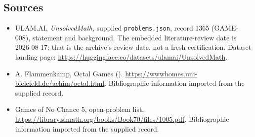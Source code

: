\documentclass[11pt,a4paper]{article}
\begin{document}
\subsection{Sources}

{\small

\begin{itemize}

\item[\hypertarget{source:1365:1}{S1}] ULAM.AI, \emph{UnsolvedMath}, supplied \texttt{problems.json}, record 1365 (GAME-008), statement and background. The embedded literature-review date is 2026-08-17; that is the archive’s review date, not a fresh certification. Dataset landing page: \url{https://huggingface.co/datasets/ulamai/UnsolvedMath}.

\item[\hypertarget{source:1365:2}{S2}] A. Flammenkamp, Octal Games (). \url{https://wwwhomes.uni-bielefeld.de/achim/octal.html}. Bibliographic information imported from the supplied record.

\item[\hypertarget{source:1365:3}{S3}] Games of No Chance 5, open-problem list. \url{https://library.slmath.org/books/Book70/files/1005.pdf}. Bibliographic information imported from the supplied record.

\end{itemize}

}

\label{end:1365}
\end{document}
